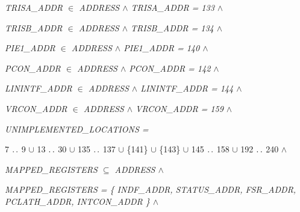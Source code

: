 \begin{sloppypar}
\hspace*{0.20in}\it TRISA\_ADDR  $\in$  \it ADDRESS  $\land$ \hspace*{0.25in}\it TRISA\_ADDR \rm = \rm 1\rm 3\rm 3  $\land$   

\hspace*{0.20in}\it TRISB\_ADDR  $\in$  \it ADDRESS  $\land$ \hspace*{0.25in}\it TRISB\_ADDR \rm = \rm 1\rm 3\rm 4  $\land$   

\hspace*{0.20in}\it PIE1\_ADDR  $\in$  \it ADDRESS  $\land$ \hspace*{0.25in}\it PIE1\_ADDR \rm = \rm 1\rm 4\rm 0  $\land$   

\hspace*{0.20in}\it PCON\_ADDR  $\in$  \it ADDRESS  $\land$ \hspace*{0.25in}\it PCON\_ADDR \rm = \rm 1\rm 4\rm 2  $\land$   

\hspace*{0.20in}\it LININTF\_ADDR  $\in$  \it ADDRESS  $\land$ \it LININTF\_ADDR \rm = \rm 1\rm 4\rm 4  $\land$   

\hspace*{0.20in}\it VRCON\_ADDR  $\in$  \it ADDRESS  $\land$ \hspace*{0.25in}\it VRCON\_ADDR \rm = \rm 1\rm 5\rm 9  $\land$   

\vspace*{4mm}
\hspace*{0.20in} 

\hspace*{0.20in}\it UNIMPLEMENTED\_LOCATIONS \rm = 

\hspace*{0.40in}\rm 7 $\mathbin{\ldotp\ldotp}$ \rm 9  $\cup$ \hspace*{0.20in}\rm 1\rm 3 $\mathbin{\ldotp\ldotp}$ \rm 3\rm 0  $\cup$  \rm 1\rm 3\rm 5 $\mathbin{\ldotp\ldotp}$ \rm 1\rm 3\rm 7  $\cup$  \rm \{\rm 1\rm 4\rm 1\rm \}  $\cup$  \rm \{\rm 1\rm 4\rm 3\rm \}  $\cup$  \rm 1\rm 4\rm 5 $\mathbin{\ldotp\ldotp}$ \rm 1\rm 5\rm 8  $\cup$  \rm 1\rm 9\rm 2 $\mathbin{\ldotp\ldotp}$ \rm 2\rm 4\rm 0  $\land$ 

\vspace*{4mm}
\hspace*{0.20in}\it MAPPED\_REGISTERS  $\subseteq$  \it ADDRESS  $\land$ 

\hspace*{0.20in}\it MAPPED\_REGISTERS \rm = \rm \{ \it INDF\_ADDR\rm , \it STATUS\_ADDR\rm , \it FSR\_ADDR\rm , \it PCLATH\_ADDR\rm , \it INTCON\_ADDR \rm \}  $\land$ 


\end{sloppypar}
